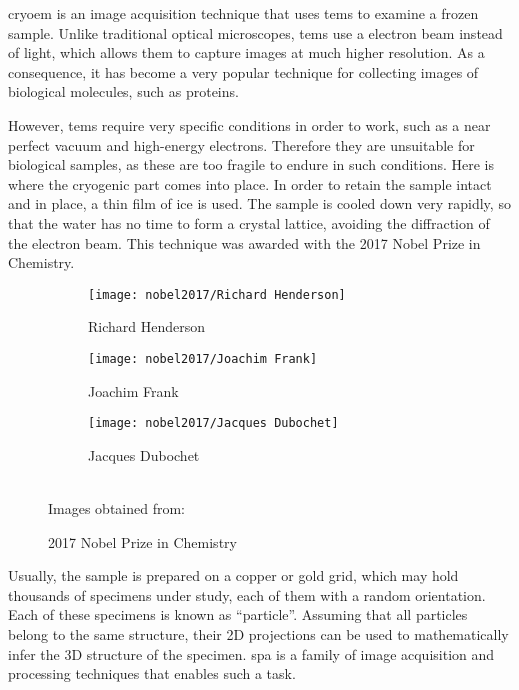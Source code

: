 \documentclass[../main.tex]{subfiles}
\begin{document}
\gls{cryoem} is an image acquisition technique that uses \glspl{tem} to examine a frozen sample. Unlike traditional optical microscopes, \glspl{tem} use a electron beam instead of light, which allows them to capture images at much higher resolution. As a consequence, it has become a very popular technique for collecting images of biological molecules, such as proteins\cite{chemistry_world_cryoem}.

However, \glspl{tem} require very specific conditions in order to work, such as a near perfect vacuum and high-energy electrons. Therefore they are unsuitable for biological samples, as these are too fragile to endure in such conditions. Here is where the cryogenic part comes into place. In order to retain the sample intact and in place, a thin film of ice is used. The sample is cooled down very rapidly, so that the water has no time to form a crystal lattice, avoiding the diffraction of the electron beam. This technique was awarded with the 2017 Nobel Prize in Chemistry\cite{chemistry_world_cryoem}.

\begin{figure}[h]
    \centering
    \begin{subfigure}[b]{0.3\textwidth}
         \centering
         \texttt{[image: nobel2017/Richard Henderson]}
         \caption{Richard Henderson}
         \label{fig:1:nobel2017:richard}
    \end{subfigure}
    \hfill
    \begin{subfigure}[b]{0.3\textwidth}
         \centering
         \texttt{[image: nobel2017/Joachim Frank]}
         \caption{Joachim Frank}
         \label{fig:1:nobel2017:joachim}
    \end{subfigure}
    \hfill
    \begin{subfigure}[b]{0.3\textwidth}
         \centering
         \texttt{[image: nobel2017/Jacques Dubochet]}
         \caption{Jacques Dubochet}
         \label{fig:1:nobel2017:jaques}
    \end{subfigure}\\
    Images obtained from: \cite{science_nobel}
    \caption{2017 Nobel Prize in Chemistry}
    \label{fig:1:nobel2017}
\end{figure}

Usually, the sample is prepared on a copper or gold grid, which may hold thousands of specimens under study, each of them with a random orientation. Each of these specimens is known as ``particle''. Assuming that all particles belong to the same structure, their 2D projections can be used to mathematically infer the 3D structure of the specimen\cite{cryoem101}. \Gls{spa} is a family of image acquisition and processing techniques that enables such a task.
\end{document}
